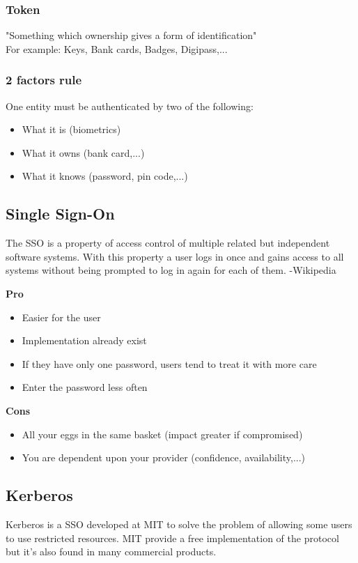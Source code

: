 \subsubsection{Token}
"Something which ownership gives a form of identification"\\
For example: Keys, Bank cards, Badges, Digipass,...
\subsubsection{2 factors rule}
One entity must be authenticated by two of the following:
\begin{itemize}
\item What it is (biometrics)
\item What it owns (bank card,...)
\item What it knows (password, pin code,...)
\end{itemize}

\subsection{Single Sign-On}
The SSO is a property of access control of multiple related but independent software systems. With this property a user logs in once and gains access to all systems without being prompted to log in again for each of them. -Wikipedia

\textbf{Pro}
\begin{itemize}
\item Easier for the user
\item Implementation already exist
\item If they have only one password, users tend to treat it with more care
\item Enter the password less often
\end{itemize}

\textbf{Cons}
\begin{itemize}
\item All your eggs in the same basket (impact greater if compromised)
\item You are dependent upon your provider (confidence, availability,...)
\end{itemize}

\subsection{Kerberos}
Kerberos is a SSO developed at MIT to solve the problem of allowing
some users to use restricted resources. MIT provide a free
implementation of the protocol but it's also found in many commercial
products.

